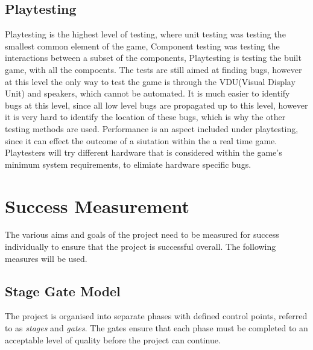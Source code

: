 \subsection{Playtesting}



Playtesting is the highest level of testing, where unit testing was testing the smallest common element of the game, Component testing was testing the interactions between a subset of the components, Playtesting is testing the built game, with all the compoents.
The tests are still aimed at finding bugs, however at this level the only way to test the game is through the VDU(Visual Display Unit) and speakers, which cannot be automated.
It is much easier to identify bugs at this level, since all low level bugs are propagated up to this level, however it is very hard to identify the location of these bugs, which is why the other testing methods are used.
Performance is an aspect included under playtesting, since it can effect the outcome of a siutation within the a real time game.
Playtesters will try different hardware that is considered within the game's minimum system requirements,  to elimiate hardware specific bugs.


\section{Success Measurement}
\label{section:success}

The various aims and goals of the project need to be measured for success individually to ensure that the project is successful overall. The following measures will be used.

\subsection{Stage Gate Model}

The project is organised into separate phases with defined control points, referred to as \emph{stages} and \emph{gates}. The gates ensure that each phase must be completed to an acceptable level of quality before the project can continue.

